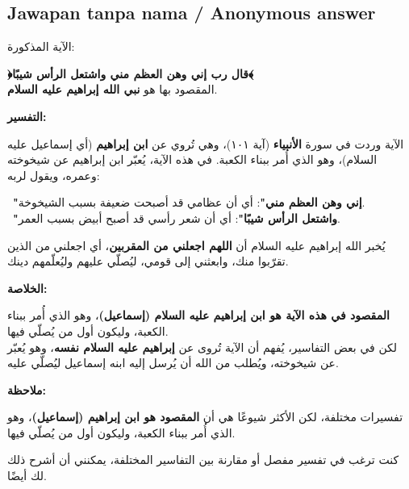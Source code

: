 \documentclass[11pt,a4paper]{article}
\newcommand{\ar}[1]{{\arabicfont #1}}
\begin{document}
\subsection*{Jawapan tanpa nama / Anonymous answer}
\ar{الآية} \ar{المذكورة}:\par\medskip \textbf{\ar{﴿قال} \ar{رب} \ar{إني} \ar{وهن} \ar{العظم} \ar{مني} \ar{واشتعل} \ar{الرأس} \ar{شيبًا﴾}}\\ \ar{المقصود} \ar{بها} \ar{هو} \textbf{\ar{نبي} \ar{الله} \ar{إبراهيم} \ar{عليه} \ar{السلام}}.\par\medskip \textbf{\ar{التفسير}:}\par\medskip \ar{هذه} \ar{الآية} \ar{وردت} \ar{في} \ar{سورة} \textbf{\ar{الأنبياء}} (\ar{آية} \ar{١٠١})\ar{،} \ar{وهي} \ar{تُروي} \ar{عن} \textbf{\ar{ابن} \ar{إبراهيم}} (\ar{أي} \ar{إسماعيل} \ar{عليه} \ar{السلام})\ar{،} \ar{وهو} \ar{الذي} \ar{أُمر} \ar{ببناء} \ar{الكعبة}. \ar{في} \ar{هذه} \ar{الآية،} \ar{يُعبّر} \ar{ابن} \ar{إبراهيم} \ar{عن} \ar{شيخوخته} \ar{وعمره،} \ar{ويقول} \ar{لربه}:\par\medskip \textbullet\ \textbf{"\ar{إني} \ar{وهن} \ar{العظم} \ar{مني}"}: \ar{أي} \ar{أن} \ar{عظامي} \ar{قد} \ar{أصبحت} \ar{ضعيفة} \ar{بسبب} \ar{الشيخوخة}.\\ \textbullet\ \textbf{"\ar{واشتعل} \ar{الرأس} \ar{شيبًا}"}: \ar{أي} \ar{أن} \ar{شعر} \ar{رأسي} \ar{قد} \ar{أصبح} \ar{أبيض} \ar{بسبب} \ar{العمر}.\par\medskip \ar{ثم} \ar{يُخبر} \ar{الله} \ar{إبراهيم} \ar{عليه} \ar{السلام} \ar{أن} \textbf{\ar{اللهم} \ar{اجعلني} \ar{من} \ar{المقربين}}\ar{،} \ar{أي} \ar{اجعلني} \ar{من} \ar{الذين} \ar{تقرّبوا} \ar{منك،} \ar{وابعثني} \ar{إلى} \ar{قومي،} \ar{ليُصلّي} \ar{عليهم} \ar{وليُعلّمهم} \ar{دينك}.\par\medskip \textbf{\ar{الخلاصة}:}\par\medskip \textbf{\ar{المقصود} \ar{في} \ar{هذه} \ar{الآية} \ar{هو} \ar{ابن} \ar{إبراهيم} \ar{عليه} \ar{السلام} (\ar{إسماعيل})}\ar{،} \ar{وهو} \ar{الذي} \ar{أُمر} \ar{ببناء} \ar{الكعبة،} \ar{وليكون} \ar{أول} \ar{من} \ar{يُصلّي} \ar{فيها}.\\ \ar{لكن} \ar{في} \ar{بعض} \ar{التفاسير،} \ar{يُفهم} \ar{أن} \ar{الآية} \ar{تُروى} \ar{عن} \textbf{\ar{إبراهيم} \ar{عليه} \ar{السلام} \ar{نفسه}}\ar{،} \ar{وهو} \ar{يُعبّر} \ar{عن} \ar{شيخوخته،} \ar{ويُطلب} \ar{من} \ar{الله} \ar{أن} \ar{يُرسل} \ar{إليه} \ar{ابنه} \ar{إسماعيل} \ar{ليُصلّي} \ar{عليه}.\par\medskip \textbf{\ar{ملاحظة}:}\par\medskip \ar{هناك} \ar{تفسيرات} \ar{مختلفة،} \ar{لكن} \ar{الأكثر} \ar{شيوعًا} \ar{هي} \ar{أن} \textbf{\ar{المقصود} \ar{هو} \ar{ابن} \ar{إبراهيم} (\ar{إسماعيل})}\ar{،} \ar{وهو} \ar{الذي} \ar{أُمر} \ar{ببناء} \ar{الكعبة،} \ar{وليكون} \ar{أول} \ar{من} \ar{يُصلّي} \ar{فيها}.\par\medskip \ar{إذا} \ar{كنت} \ar{ترغب} \ar{في} \ar{تفسير} \ar{مفصل} \ar{أو} \ar{مقارنة} \ar{بين} \ar{التفاسير} \ar{المختلفة،} \ar{يمكنني} \ar{أن} \ar{أشرح} \ar{ذلك} \ar{لك} \ar{أيضًا}.
\end{document}
